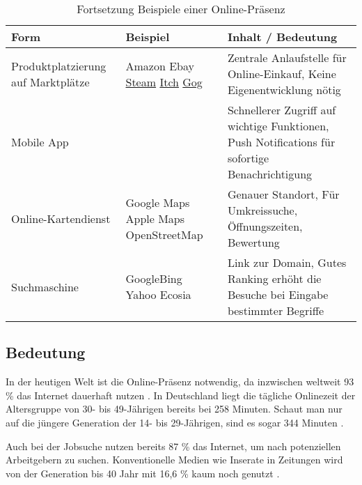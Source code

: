 \begin{table}[H]
\centering
\caption{Fortsetzung Beispiele einer Online-Präsenz}
\label{tab:beispiele2}
\begin{tabular}{ | p{4cm} | p{3cm} | p{6cm} | }
\hline
Form & Beispiel & Inhalt / Bedeutung \\ 
\hline
Produktplatzierung auf Marktplätze &
Amazon \newline
Ebay \newline
\href{https://store.steampowered.com/}{Steam} \newline
\href{https://itch.io/}{Itch} \newline
\href{https://www.gog.com/}{Gog}
& Zentrale Anlaufstelle für Online-Einkauf, \newline
Keine Eigenentwicklung nötig
\\ \hline
Mobile App &
&
Schnellerer Zugriff auf wichtige Funktionen, \newline
Push Notifications für sofortige Benachrichtigung
\\ \hline
Online-Kartendienst &
Google Maps\newline
Apple Maps \newline
OpenStreetMap &
Genauer Standort, \newline
Für Umkreissuche, \newline
Öffnungszeiten, \newline
Bewertung
\\ \hline
Suchmaschine & Google\newline Bing \newline Yahoo \newline Ecosia &
Link zur Domain, \newline
Gutes Ranking erhöht die Besuche bei Eingabe bestimmter Begriffe
\\ \hline
\end{tabular}
\end{table}

\subsection{Bedeutung}
In der heutigen Welt ist die Online-Präsenz notwendig, da inzwischen weltweit 93 \% das Internet dauerhaft nutzen \cite{internetnutzer}. In Deutschland liegt die tägliche Onlinezeit der Altersgruppe von 30- bis 49-Jährigen bereits bei 258 Minuten. Schaut man nur auf die jüngere Generation der 14- bis 29-Jährigen, sind es sogar 344 Minuten \cite{nutzungsdauer}.

Auch bei der Jobsuche nutzen bereits 87 \% das Internet, um nach potenziellen Arbeitgebern zu suchen. Konventionelle Medien wie Inserate in Zeitungen wird von der Generation bis 40 Jahr mit 16,6 \% kaum noch genutzt \cite{stepstone}.


